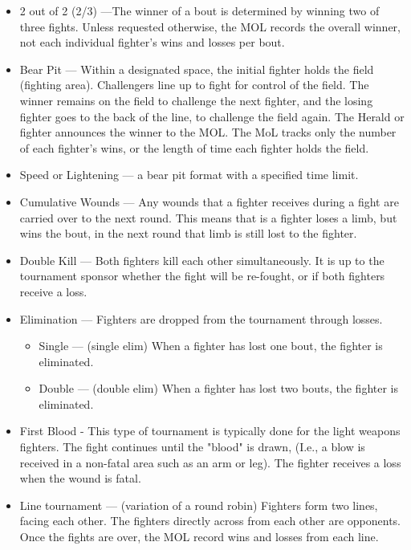 \documentclass{article}
\begin{document}
\begin{itemize}
\item 2 out of 2 (2/3) ---The winner of a bout is determined by winning two of three fights. Unless requested
otherwise, the MOL records the overall winner, not each individual fighter’s wins and losses per bout.

\item Bear Pit --- Within a designated space, the initial fighter holds the field (fighting area). Challengers
line up to fight for control of the field. The winner remains on the field to challenge the next fighter,
and the losing fighter goes to the back of the line, to challenge the field again. The Herald or fighter
announces the winner to the MOL. The MoL tracks only the number of each fighter’s wins, or the
length of time each fighter holds the field.

\item Speed or Lightening --- a bear pit format with a specified time limit.
\item Cumulative Wounds --- Any wounds that a fighter receives during a fight are carried over to the next
round. This means that is a fighter loses a limb, but wins the bout, in the next round that limb is still
lost to the fighter.

\item Double Kill --- Both fighters kill each other simultaneously. It is up to the tournament sponsor whether
the fight will be re-fought, or if both fighters receive a loss.

\item Elimination --- Fighters are dropped from the tournament through losses.
\begin{itemize}
\item Single --- (single elim) When a fighter has lost one bout, the fighter is eliminated.

\item Double --- (double elim) When a fighter has lost two bouts, the fighter is eliminated.
\end{itemize}
\item First Blood - This type of tournament is typically done for the light weapons fighters. The fight
continues until the "blood" is drawn, (I.e., a blow is received in a non-fatal area such as an arm or leg).
The fighter receives a loss when the wound is fatal.

\item Line tournament --- (variation of a round robin) Fighters form two lines, facing each other. The
fighters directly across from each other are opponents. Once the fights are over, the MOL record wins
and losses from each line.


\end{itemize}
\end{document}

